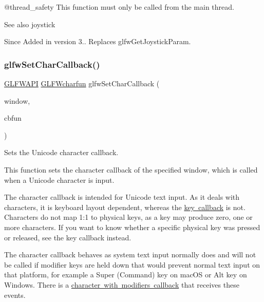 @thread\+\_\+safety This function must only be called from the main thread.

\begin{DoxySeeAlso}{See also}
joystick
\end{DoxySeeAlso}
\begin{DoxySince}{Since}
Added in version 3.. Replaces {\ttfamily glfw\+Get\+Joystick\+Param}. 
\end{DoxySince}
\mbox{\label{group__input_ga07b2959b23dc3e466ce7475746021002}} 
\subsubsection{\texorpdfstring{glfwSetCharCallback()}{glfwSetCharCallback()}}
{\footnotesize\ttfamily \mbox{\hyperlink{glfw3_8h_a56da5036b2cc259351ae22fd6439bb47}{G\+L\+F\+W\+A\+PI}} \mbox{\hyperlink{group__input_gabf24451c7ceb1952bc02b17a0d5c3e5f}{G\+L\+F\+Wcharfun}} glfw\+Set\+Char\+Callback (\begin{DoxyParamCaption}\item[{\mbox{\hyperlink{group__window_ga3c96d80d363e67d13a41b5d1821f3242}{G\+L\+F\+Wwindow}} $\ast$}]{window,  }\item[{\mbox{\hyperlink{group__input_gabf24451c7ceb1952bc02b17a0d5c3e5f}{G\+L\+F\+Wcharfun}}}]{cbfun }\end{DoxyParamCaption})}



Sets the Unicode character callback. 

This function sets the character callback of the specified window, which is called when a Unicode character is input.

The character callback is intended for Unicode text input. As it deals with characters, it is keyboard layout dependent, whereas the \mbox{\hyperlink{group__input_gaa73bb92f628a2a0be9c132d56f19362c}{key callback}} is not. Characters do not map 1\+:1 to physical keys, as a key may produce zero, one or more characters. If you want to know whether a specific physical key was pressed or released, see the key callback instead.

The character callback behaves as system text input normally does and will not be called if modifier keys are held down that would prevent normal text input on that platform, for example a Super (Command) key on mac\+OS or Alt key on Windows. There is a \mbox{\hyperlink{group__input_gae6eee0bda7429bfe8028615847cf6795}{character with modifiers callback}} that receives these events.


